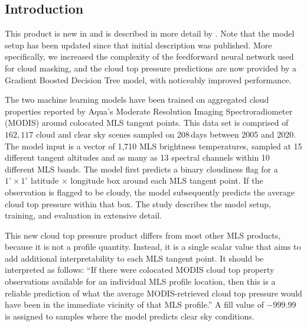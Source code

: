 
\subsection{Introduction}

This product is new in \thisv and is described in more detail by \citet{WernerEtal:2021}. Note that the model setup has been updated since that initial description was published. More specifically, we increased the complexity of the feedforward neural network used for cloud masking, and the cloud top pressure predictions are now provided by a Gradient Boosted Decision Tree model, with noticeably improved performance.

The two machine learning models have been trained on aggregated cloud properties reported by Aqua's Moderate Resolution Imaging Spectroradiometer (MODIS) around colocated MLS tangent points. This data set is comprised of $162,117$ cloud and clear sky scenes sampled on 208\,days between 2005 and 2020. The model input is a vector of 1,710 MLS brightness temperatures, sampled at 15 different tangent altitudes and as many as 13 spectral channels within 10 different MLS bands. The model first predicts a binary cloudiness flag for a $1^{\circ} \times 1^{\circ}$ latitude $\times$ longitude box around each MLS tangent point. If the observation is flagged to be cloudy, the model subsequently predicts the average cloud top pressure within that box. The \citet{WernerEtal:2021} study describes the model setup, training, and evaluation in extensive detail.

This new cloud top pressure product differs from most other MLS products, because it is not a profile quantity. Instead, it is a single scalar value that aims to add additional interpretability to each MLS tangent point. It should be interpreted as follows: ``If there were colocated MODIS cloud top property observations available for an individual MLS profile location, then this is a reliable prediction of what the average MODIS-retrieved cloud top pressure would have been in the immediate vicinity of that MLS profile.'' A fill value of $-999.99$ is assigned to samples where the model predicts clear sky conditions.

